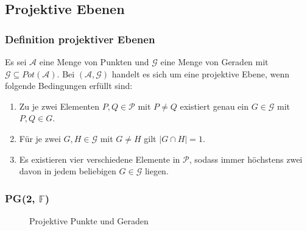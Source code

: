 \documentclass{beamer}
\theoremstyle{plain}
\theoremstyle{definition}
\theoremstyle{rem}
\newcommand{\pgtwo}{PG(2, $\mathbb{F}$)\ }
\begin{document}
\subsection{Projektive Ebenen}
\begin{frame}
    \frametitle{Definition projektiver Ebenen}
    \begin{definition}
        Es sei $\mathcal{A}$ eine Menge von Punkten und $\mathcal{G}$ eine Menge von Geraden mit $\mathcal{G} \subseteq Pot(\mathcal{A})$.
        Bei $(\mathcal{A},\mathcal{G})$ handelt es sich um eine projektive Ebene, wenn folgende Bedingungen erfüllt sind:
	\begin{enumerate}[<+(1)->]
		\item Zu je zwei Elementen $P, Q\in \mathcal{P}$ mit $P\ne Q$ existiert genau ein $G\in\mathcal{G}$ mit $P, Q \in G$. \\
		\item Für je zwei $G,H\in\mathcal{G}$ mit $G\ne H$ gilt $|G\cap H|=1$.
		\item Es existieren vier verschiedene Elemente in $\mathcal{P}$, sodass immer höchstens zwei davon in jedem beliebigen $G\in\mathcal{G}$ liegen.
	\end{enumerate}
    \end{definition}
\end{frame}
\begin{frame}
    \frametitle{\pgtwo}
\begin{figure}[H]
\centering
{}
\caption{Projektive Punkte und Geraden}
\end{figure}

\end{frame}
\end{document}
